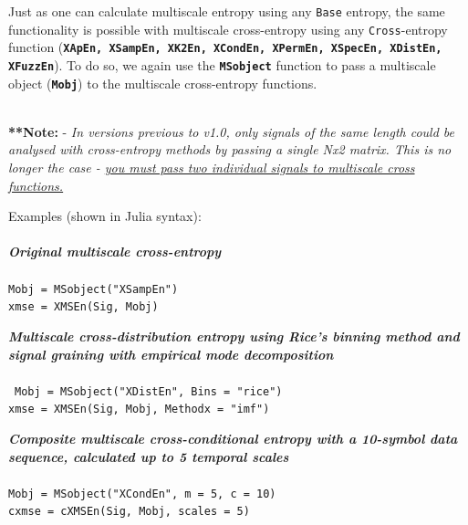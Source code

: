 \documentclass[12pt, a4paper, titlepage, openany]{book}
\begin{document}
Just as one can calculate multiscale entropy using any \texttt{Base} entropy, the same functionality is possible with multiscale cross-entropy using any \texttt{Cross}-entropy function (\texttt{\textbf{XApEn, XSampEn, XK2En, XCondEn, XPermEn, XSpecEn, XDistEn, XFuzzEn}}). To do so, we again use the \texttt{\textbf{MSobject}} function to pass a multiscale object (\texttt{\textbf{Mobj}}) to the multiscale cross-entropy functions.

\begin{center}
 \ \\

\textbf{**Note:} -  \emph{In versions previous to v1.0, only signals of the same length could be analysed with cross-entropy methods by passing a single Nx2 matrix. This is no longer the case - \underline{you must pass two individual signals to multiscale cross functions.}}
\end{center}


 
\noindent Examples (shown in Julia syntax)$\colon$ \footnotesize
\\ \ \\ \noindent \emph{\textbf{Original multiscale cross-entropy}} \cite{MS1}
\\ \ \\ \indent \texttt{Mobj = MSobject("XSampEn") \\
\indent xmse = XMSEn(Sig, Mobj)}

\noindent \emph{\textbf{Multiscale cross-distribution entropy using Rice's binning method and signal graining with empirical mode decomposition}} \cite{MS6} \cite{Dist1}\\
\\ \ \indent \texttt{Mobj = MSobject("XDistEn", Bins = "rice")\\
\indent xmse = XMSEn(Sig, Mobj, Methodx = "imf")}

\noindent \emph{\textbf{Composite multiscale cross-conditional entropy with a 10-symbol data sequence, calculated up to 5 temporal scales}} \cite{cMS1} \cite{Cond1}
\\ \ \\ \indent \texttt{Mobj = MSobject("XCondEn", m = 5, c = 10)\\
\indent cxmse = cXMSEn(Sig, Mobj, scales = 5)}
\end{document}
